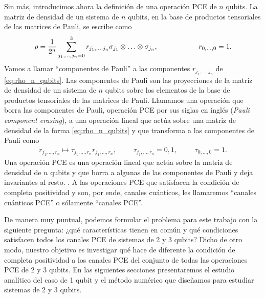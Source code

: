 Sin más, introducimos ahora la definición de una operación PCE de 
$n$ qubits. La matriz de densidad de un sistema de $n$ qubits, en la base de
productos tensoriales de las matrices de Pauli, se escribe como
\begin{align}\label{eq:rho_n_qubits}
\rho=\frac{1}{2^n}\sum_{j_1,\ldots,j_n=0}^3
r_{j_1,\ldots,j_n}\sigma_{j_1}\otimes\ldots\otimes\sigma_{j_n},
\hspace{2cm} r_{0,\ldots,0}=1.
\end{align}
Vamos a llamar ``componentes de Pauli'' a las componentes $r_{j_1,\ldots,j_n}$
de \eqref{eq:rho_n_qubits}. Las componentes de Pauli son las proyecciones
de la matriz de densidad de un sistema de $n$ qubits sobre los elementos
de la base de productos tensoriales de las matrices de Pauli.
Llamamos una operación que borra las componentes de Pauli, 
operación PCE por sus siglas en inglés (\textit{Pauli
component erasing}), a una operación lineal que actúa sobre una 
matriz de densidad de la forma \eqref{eq:rho_n_qubits} y 
que transforma a las componentes de Pauli como
\begin{align}\label{eq:PCE_definition}
r_{j_1,\ldots,r_n}\longmapsto \tau_{j_1,\ldots,r_n}r_{j_1,\ldots,r_n},
\hspace{1cm} \tau_{j_1,\ldots,r_n} = 0,1,
\hspace{1cm} \tau_{0,\ldots,0}=1.
\end{align}
Una operación PCE es una operación lineal que actúa sobre la matriz 
de densidad de $n$ qubits y que borra a algunas de las componentes de 
Pauli y deja invariantes al resto.
. A las operaciones PCE que satisfacen 
la condición de completa positividad y son, por ende, canales cuánticos,
les llamaremos ``canales cuánticos PCE'' o sólamente ``canales PCE''.

De manera muy puntual, podemos formular el problema para 
este trabajo con la siguiente pregunta: ¿qué características tienen 
en común y qué condiciones satisfacen todos los canales PCE 
de sistemas de 2 y 3 qubits? Dicho de otro modo, 
nuestro objetivo es investigar qué hace de diferente la condición de 
completa positividad a los canales PCE del conjunto de todas las 
operaciones PCE de 2 y 3 qubits.
En las siguientes secciones presentaremos el estudio analítico del 
caso de 1 qubit y el método numérico que diseñamos 
para estudiar sistemas de 2 y 3 qubits. 


